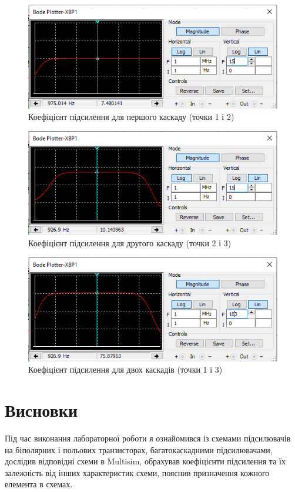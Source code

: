 \documentclass{article}
\begin{document}
\begin{normalsize}
	\begin{figure}[H]
		\centering
		\includegraphics[width=\textwidth]{33}
		\caption{Коефіцієнт підсилення для першого каскаду (точки 1 і 2)}
	\end{figure}
	
	\begin{figure}[H]
		\centering
		\includegraphics[width=\textwidth]{34}
		\caption{Коефіцієнт підсилення для другого каскаду (точки 2 і 3)}
	\end{figure}
	
	\begin{figure}[H]
		\centering
		\includegraphics[width=\textwidth]{35}
		\caption{Коефіцієнт підсилення для двох каскадів (точки 1 і 3)}
	\end{figure}
	
	\section*{Висновки}
	Під час виконання лабораторної роботи я ознайомився із схемами підсилювачів на біполярних і польових транзисторах, багатокаскадними підсилювачами, дослідив відповідні схеми в Multisim, обрахував коефіцієнти підсилення та їх залежність від інших характеристик схеми, пояснив призначення кожного елемента в схемах.
	    
\end{normalsize}
\end{document}
